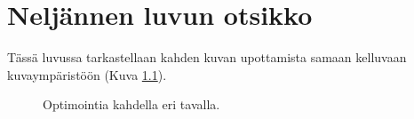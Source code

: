 \chapter{Neljännen luvun otsikko} \label{Neljäs luku}

Tässä luvussa tarkastellaan kahden kuvan upottamista samaan kelluvaan
kuvaympäristöön (Kuva \ref{fig:Optimointia-kahdella-eri}).

\begin{figure}[tbh]
\caption{Optimointia kahdella eri tavalla.\label{fig:Optimointia-kahdella-eri}}

\end{figure}